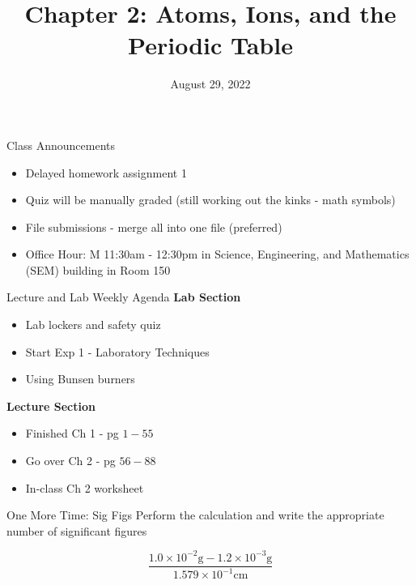 \documentclass[11pt]{beamer}
\title{Chapter 2: Atoms, Ions, and the Periodic Table}
\institute{Chemistry Department, Cypress College}
\date{August 29, 2022}
\begin{document}
\begin{frame}
  \titlepage
\end{frame}

\begin{frame}{Class Announcements}
  \begin{itemize}
  \item Delayed homework assignment 1
  \item Quiz will be manually graded (still working out the
    kinks - math symbols)
  \item File submissions - merge all into one file (preferred)
  \item Office Hour: M 11:30am - 12:30pm in Science, Engineering,
    and Mathematics (SEM) building in Room 150
  \end{itemize}
\end{frame}

\begin{frame}{Lecture and Lab Weekly Agenda}
  \textbf{Lab Section}

  \begin{itemize}
  \item Lab lockers and safety quiz
  \item Start Exp 1 - Laboratory Techniques
  \item Using Bunsen burners
  \end{itemize}

  \textbf{Lecture Section}

  \begin{itemize}
  \item Finished Ch 1 - pg $1 - 55$
  \item Go over Ch 2 - pg $56 - 88$
  \item In-class Ch 2 worksheet
  \end{itemize}
\end{frame}

\begin{frame}{One More Time: Sig Figs}
  Perform the calculation and write the appropriate number
  of significant figures
  
  \begin{equation*}
    \frac{1.0\times 10^{-2}\text{g} - 1.2\times 10^{-3}\text{g}}
    {1.579\times 10^{-1}\text{cm}}
  \end{equation*}
\end{frame}
\end{document}
